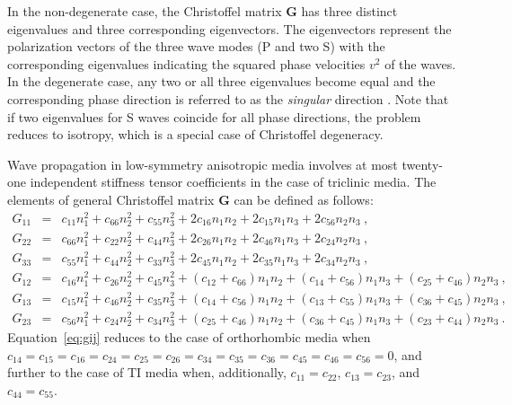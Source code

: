 In the non-degenerate case, the Christoffel matrix $\mathbf{G}$ has three distinct eigenvalues and three corresponding eigenvectors. The eigenvectors represent the polarization vectors of the three wave modes (P and two S) with the corresponding eigenvalues indicating the squared phase velocities $v^2$ of the waves. In the degenerate case, any two or all three eigenvalues become equal and the corresponding phase direction is referred to as the \textit{singular} direction \cite[]{vavsing}. Note that if two eigenvalues for S waves coincide for all phase directions, the problem reduces to isotropy, which is a special case of Christoffel degeneracy.

Wave propagation in low-symmetry anisotropic media involves at most twenty-one independent stiffness tensor coefficients in the case of triclinic media. The elements of general Christoffel matrix $\mathbf{G}$ can be defined as follows:
\begin{eqnarray} 
\label{eq:gij}
G_{11} & = & c_{11}n_1^2 + c_{66}n_2^2 + c_{55}n_3^2 + 2c_{16}n_1n_2 + 2c_{15}n_1n_3 + 2c_{56}n_2n_3~,\\
\nonumber
G_{22} & = & c_{66}n_1^2 + c_{22}n_2^2 + c_{44}n_3^2 + 2c_{26}n_1n_2 + 2c_{46}n_1n_3 + 2c_{24}n_2n_3~,\\
\nonumber
G_{33} & = & c_{55}n_1^2 + c_{44}n_2^2 + c_{33}n_3^2 + 2c_{45}n_1n_2 + 2c_{35}n_1n_3 + 2c_{34}n_2n_3~,\\
\nonumber
G_{12} & = & c_{16}n_1^2 + c_{26}n_2^2 + c_{45}n_3^2 + (c_{12}+c_{66})n_1n_2 + (c_{14}+c_{56})n_1n_3 + (c_{25}+c_{46})n_2n_3~,\\
\nonumber
G_{13} & = & c_{15}n_1^2 + c_{46}n_2^2 + c_{35}n_3^2 + (c_{14}+c_{56})n_1n_2 + (c_{13}+c_{55})n_1n_3 + (c_{36}+c_{45})n_2n_3~,\\
\nonumber
G_{23} & = & c_{56}n_1^2 + c_{24}n_2^2 + c_{34}n_3^2 + (c_{25}+c_{46})n_1n_2 + (c_{36}+c_{45})n_1n_3 + (c_{23}+c_{44})n_2n_3~.
\end{eqnarray}
Equation~\ref{eq:gij} reduces to the case of orthorhombic media when $c_{14}=c_{15}=c_{16}=c_{24}=c_{25}=c_{26}=c_{34}=c_{35}=c_{36}=c_{45}=c_{46}=c_{56}=0$, and further to the case of TI media when, additionally,  $c_{11}=c_{22}$, $c_{13}=c_{23}$, and $c_{44}=c_{55}$.

\newpage
\onecolumn


